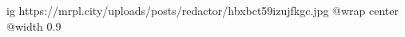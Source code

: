  
 
 
 
 

\ifcmt
  ig https://mrpl.city/uploads/posts/redactor/hbxbct59izujfkgc.jpg
  @wrap center
  @width 0.9
\fi
